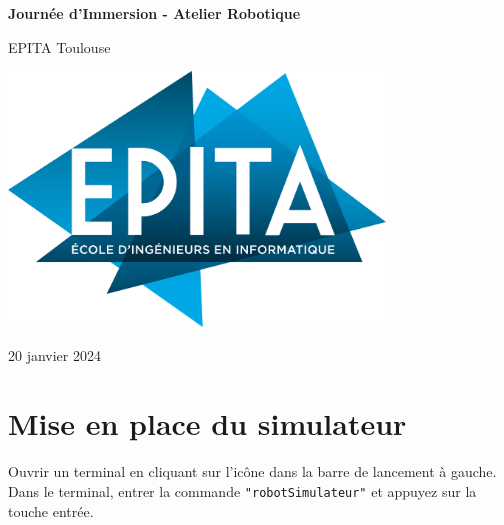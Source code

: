 \documentclass{report}
\begin{document}
\begin{titlepage}
\begin{center}

    \vspace*{2cm}

    {\huge\bfseries\textcolor{MainColor}{Journée d'Immersion - Atelier Robotique}}

    \vspace{2cm}

    {\Large\textcolor{MainColor}{EPITA Toulouse}}

    \vspace{2cm}

    \includegraphics[width=0.75\textwidth]{img/epita.png}

    \vspace{4cm}

    {\large\textcolor{MainColor}{20 janvier 2024}}

\end{center}
\end{titlepage}



\section{Mise en place du simulateur}

\begin{itemize}
    \step Ouvrir un terminal en cliquant sur l'icône  dans la barre de lancement à gauche.
    \step Dans le terminal, entrer la commande \texttt{"robotSimulateur"} et appuyez sur la touche entrée.
\end{itemize}
\end{document}
